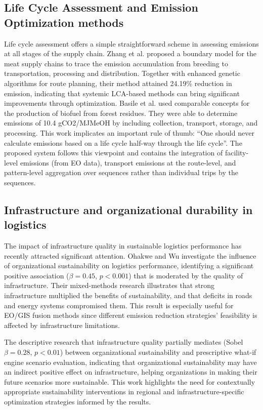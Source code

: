 \documentclass[conference]{IEEEtran}
\begin{document}
\subsection{Life Cycle Assessment and Emission Optimization methods}
Life cycle assessment offers a simple straightforward scheme in assessing emissions at all stages of the supply chain. Zhang et al. \cite{zhang2024carbon} proposed a boundary model for the meat supply chains to trace the emission accumulation from breeding to transportation, processing and distribution. Together with enhanced genetic algorithms for route planning, their method attained 24.19\% reduction in emission, indicating that systemic LCA-based methods can bring significant improvements through optimization. Basile et al. \cite{basile2022supply} used comparable concepts for the production of biofuel from forest residues. They were able to determine emissions of 10.4 gCO2/MJMeOH by including collection, transport, storage, and processing. This work implicates an important rule of thumb: ``One should never calculate emissions based on a life cycle half-way through the life cycle''. The proposed system follows this viewpoint and contains the integration of facility-level emissions (from EO data), transport emissions at the route-level, and pattern-level aggregation over sequences rather than individual trips by the sequences.

\subsection{Infrastructure and organizational durability in logistics}
The impact of infrastructure quality in sustainable logistics performance has recently attracted significant attention. Ohakwe and Wu \cite{ohakwe2025impact} investigate the influence of organizational sustainability on logistics performance, identifying a significant positive association ($\beta = 0.45$, $p < 0.001$) that is moderated by the quality of infrastructure. Their mixed-methods research illustrates that strong infrastructure multiplied the benefits of sustainability, and that deficits in roads and energy systems compromised them. This result is especially useful for EO/GIS fusion methods since different emission reduction strategies' feasibility is affected by infrastructure limitations.

The descriptive research that infrastructure quality partially mediates (Sobel $\beta = 0.28$, $p < 0.01$) between organizational sustainability and prescriptive what-if engine scenario evaluation, indicating that organizational sustainability may have an indirect positive effect on infrastructure, helping organizations in making their future scenarios more sustainable. This work highlights the need for contextually appropriate sustainability interventions in regional and infrastructure-specific optimization strategies informed by the results.
\end{document}
